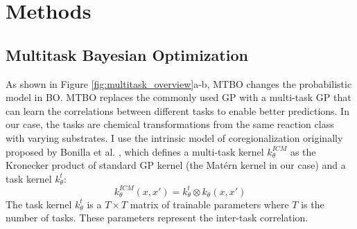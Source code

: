 \section{Methods}

\subsection{Multitask Bayesian Optimization}

As shown in Figure \ref{fig:multitask_overview}a-b, MTBO changes the probabilistic model in BO.  MTBO replaces the commonly used GP with a multi-task GP that can learn the correlations between different tasks to enable better predictions. In our case, the tasks are chemical transformations from the same reaction class with varying substrates. I use the intrinsic model of coregionalization originally proposed by Bonilla et al. \cite{Bonilla2007}, which defines a multi-task kernel $k^{ICM}_{\theta}$ as the Kronecker product of standard GP kernel (the Matérn kernel in our case) and a task kernel $k^t_{\theta}$:
\begin{equation}
    k^{ICM}_{\theta}(x,x') = k^t_{\theta} \otimes  k_{\theta}(x,x')
\end{equation}
The task kernel $k^t_{\theta}$ is a $T \times T$ matrix of trainable parameters where $T$ is the number of tasks. These parameters represent the inter-task correlation.

